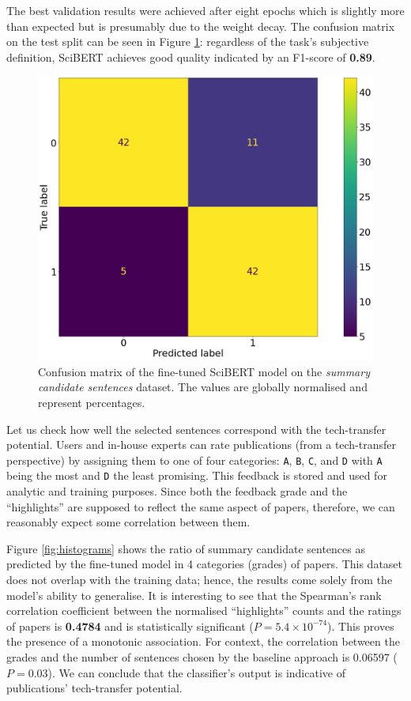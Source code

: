 The best validation results were achieved after eight epochs which is slightly more than expected but is presumably due to the weight decay. The confusion matrix on the test split can be seen in Figure \ref{fig:scibert-confusion}: regardless of the task's subjective definition, SciBERT achieves good quality indicated by an F1-score of \textbf{0.89}.

\begin{figure}
    \centering
    \includegraphics[width=0.4\linewidth]{figures/scibert-confusion.png}
    \captionsetup{width=.9\linewidth}
    \caption{Confusion matrix of the fine-tuned SciBERT model on the \textit{summary candidate sentences} dataset. The values are globally normalised and represent percentages.}
    \label{fig:scibert-confusion}
\end{figure}

Let us check how well the selected sentences correspond with the tech-transfer potential. Users and in-house experts can rate publications (from a tech-transfer perspective) by assigning them to one of four categories: \texttt{A}, \texttt{B}, \texttt{C}, and \texttt{D} with \texttt{A} being the most and \texttt{D} the least promising. This feedback is stored and used for analytic and training purposes. Since both the feedback grade and the ``highlights'' are supposed to reflect the same aspect of papers, therefore, we can reasonably expect some correlation between them.

Figure \ref{fig:histograms} shows the ratio of summary candidate sentences as predicted by the fine-tuned model in 4 categories (grades) of papers. This dataset does not overlap with the training data; hence, the results come solely from the model's ability to generalise. It is interesting to see that the Spearman's rank correlation coefficient \cite{spearman1961proof} between the normalised ``highlights'' counts and the ratings of papers is \textbf{0.4784} and is statistically significant ($P = 5.4 \times 10^{-74}$). This proves the presence of a monotonic association. For context, the correlation between the grades and the number of sentences chosen by the baseline approach is 0.06597 ($P = 0.03$). We can conclude that the classifier's output is indicative of publications' tech-transfer potential. 

